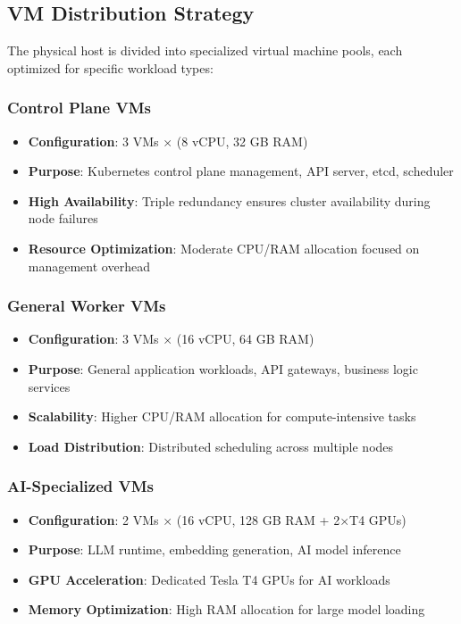 \documentclass[12pt]{report}
\begin{document}
\subsection{VM Distribution Strategy}
The physical host is divided into specialized virtual machine pools, each optimized for specific workload types:

\subsubsection{Control Plane VMs}
\begin{itemize}
  \item \textbf{Configuration}: 3 VMs × (8 vCPU, 32 GB RAM)
  \item \textbf{Purpose}: Kubernetes control plane management, API server, etcd, scheduler
  \item \textbf{High Availability}: Triple redundancy ensures cluster availability during node failures
  \item \textbf{Resource Optimization}: Moderate CPU/RAM allocation focused on management overhead
\end{itemize}

\subsubsection{General Worker VMs}
\begin{itemize}
  \item \textbf{Configuration}: 3 VMs × (16 vCPU, 64 GB RAM)
  \item \textbf{Purpose}: General application workloads, API gateways, business logic services
  \item \textbf{Scalability}: Higher CPU/RAM allocation for compute-intensive tasks
  \item \textbf{Load Distribution}: Distributed scheduling across multiple nodes
\end{itemize}

\subsubsection{AI-Specialized VMs}
\begin{itemize}
  \item \textbf{Configuration}: 2 VMs × (16 vCPU, 128 GB RAM + 2×T4 GPUs)
  \item \textbf{Purpose}: LLM runtime, embedding generation, AI model inference
  \item \textbf{GPU Acceleration}: Dedicated Tesla T4 GPUs for AI workloads
  \item \textbf{Memory Optimization}: High RAM allocation for large model loading
\end{itemize}
\end{document}
